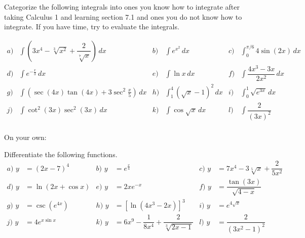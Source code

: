 \documentclass[]{ximera}
\begin{document}
\begin{problem}
Categorize the following integrals into ones you know how to integrate after taking Calculus 1 and learning section 7.1 and ones you do not know how to integrate.  If you have time, try to evaluate the integrals.

\begin{align*}
a) & \int \left(3x^4-\sqrt[3]{x^2} + \dfrac{2}{\sqrt[7]{x}}\right)  \, dx  & b) & \int e^{x^2} \, dx & c) & \int^{\pi/6}_{0} 4 \sin(2x) \, dx  \\
d) & \int e^{-\frac{x}{3}} \, dx  & e) & \int \ln x \, dx & f) & \int \dfrac{4x^3-3x}{2x^2} \, dx  \\
g) & \int \left( \sec(4x) \tan(4x) + 3 \sec^2 \frac{x}{5} \right) \, dx  & h) & \int^4_1 (\sqrt{x}-1)^2 \, dx  & i) & \int_0^1 \sqrt{e^{3x}} \, dx  \\
j) &\int \cot^2 (3x) \sec^2 (3x) \, dx & k) & \int \cos \sqrt{x} \, dx & l) & \int \dfrac{2}{(3x)^2} \\
\end{align*}
			
			
\end{problem}

On your own:
\begin{problem}

Differentiate the following functions.
\begin{align*}
a)  \, \, y &= (2x-7)^4  & b) \, \, y &=  e^{\frac{x}{4}} & c) \, \, y&= 7x^4-3\sqrt[5]{x} + \dfrac{2}{5x^2} \\
d) \, \, y&= \ln(2x+\cos x) & e) \, \, y&=2xe^{-x} & f) \, \, y&= \dfrac{\tan{(3x)}}{\sqrt{4-x}} \\
g) \, \, y&= \csc{\left(e^{4x}\right)} & h) \, \, y&= [\ln(4x^3-2x)]^3 & i) \, \, y&= e^{4 \sqrt{x}} \\
j) \, \, y&=4e^{x \sin x} & k) \, \, y&= 6x^9-\dfrac{1}{8x^4}+\dfrac{2}{\sqrt[3]{2x-1}} & l) \, \, y &=\dfrac{2}{(3x^2-1)^2} \\
\end{align*}

	


	
\end{problem}
\end{document}
